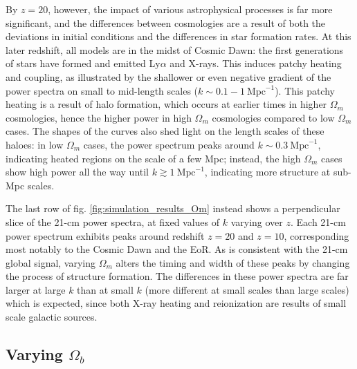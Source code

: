 \documentclass[floats,floatfix,showpacs,amssymb,prd,superscriptaddress,nofootinbib]{revtex4-2} %
\begin{document}
By $z = 20$, however, the impact of various astrophysical processes is far more significant, and the differences between cosmologies are a result of both the deviations in initial conditions and the differences in star formation rates. At this later redshift, all models are in the midst of Cosmic Dawn: the first generations of stars have formed and emitted Ly$\alpha$ and X-rays. This induces patchy heating and coupling, as illustrated by the shallower or even negative gradient of the power spectra on small to mid-length scales ($k \sim 0.1 - 1 ~\text{Mpc}^{-1}$). This patchy heating is a result of halo formation, which occurs at earlier times in higher $\Omega_m$ cosmologies, hence the higher power in high $\Omega_m$ cosmologies compared to low $\Omega_m$ cases. The shapes of the curves also shed light on the length scales of these haloes: in low $\Omega_m$ cases, the power spectrum peaks around $k \sim 0.3 ~\text{Mpc}^{-1}$, indicating heated regions on the scale of a few Mpc; instead, the high $\Omega_m$ cases show high power all the way until $k \gtrsim 1 ~\text{Mpc}^{-1}$, indicating more structure at sub-Mpc scales. 



The last row of fig. \ref{fig:simulation_results_Om} instead shows a perpendicular slice of the 21-cm power spectra, at fixed values of $k$ varying over $z$. Each 21-cm power spectrum exhibits peaks around redshift $z = 20$ and $z = 10$, corresponding most notably to the Cosmic Dawn and the EoR. As is consistent with the 21-cm global signal, varying $\Omega_m$ alters the timing and width of these peaks by changing the process of structure formation. The differences in these power spectra are far larger at large $k$ than at small $k$ (more different at small scales than large scales) which is expected, since both X-ray heating and reionization are results of small scale galactic sources. 


\subsection{Varying $\Omega_b$}
\end{document}
